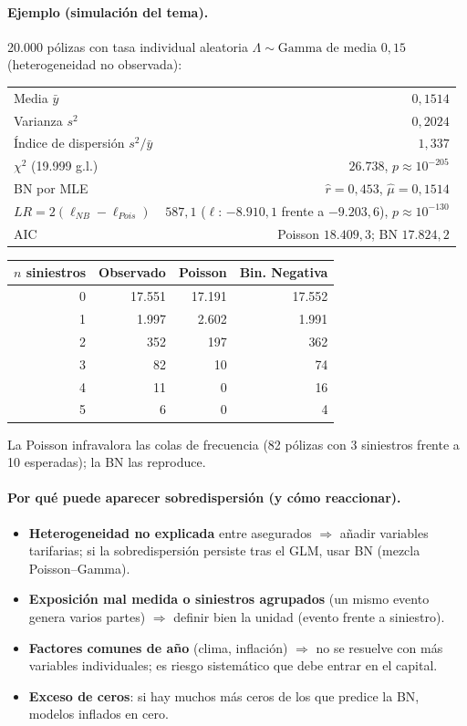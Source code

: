 \documentclass[a4paper,12pt]{article}
\begin{document}
\paragraph{Ejemplo (simulaci\'on del tema).} 20.000 p\'olizas con tasa individual aleatoria $\Lambda\sim\text{Gamma}$ de media $0{,}15$ (heterogeneidad no observada):
\begin{center}
\begin{tabular}{lr}
\toprule
Media $\bar y$ & $0{,}1514$\\
Varianza $s^2$ & $0{,}2024$\\
\'Indice de dispersi\'on $s^2/\bar y$ & $1{,}337$\\
$\chi^2$ (19.999 g.l.) & $26.738$, $p\approx10^{-205}$\\
BN por MLE & $\hat r=0{,}453$, $\hat\mu=0{,}1514$\\
$LR=2(\ell_{NB}-\ell_{Pois})$ & $587{,}1$ ($\ell$: $-8.910{,}1$ frente a $-9.203{,}6$), $p\approx10^{-130}$\\
AIC & Poisson $18.409{,}3$; BN $17.824{,}2$\\
\bottomrule
\end{tabular}
\end{center}
\begin{center}
\begin{tabular}{rrrr}
\toprule
$n$ siniestros & Observado & Poisson & Bin. Negativa\\
\midrule
0 & 17.551 & 17.191 & 17.552\\
1 & 1.997 & 2.602 & 1.991\\
2 & 352 & 197 & 362\\
3 & 82 & 10 & 74\\
4 & 11 & 0 & 16\\
5 & 6 & 0 & 4\\
\bottomrule
\end{tabular}
\end{center}
La Poisson infravalora las colas de frecuencia (82 p\'olizas con 3 siniestros frente a 10 esperadas); la BN las reproduce.

\paragraph{Por qu\'e puede aparecer sobredispersi\'on (y c\'omo reaccionar).}
\begin{itemize}[leftmargin=*,itemsep=1pt]
\item \textbf{Heterogeneidad no explicada} entre asegurados $\Rightarrow$ a\~nadir variables tarifarias; si la sobredispersi\'on persiste tras el GLM, usar BN (mezcla Poisson--Gamma).
\item \textbf{Exposici\'on mal medida o siniestros agrupados} (un mismo evento genera varios partes) $\Rightarrow$ definir bien la unidad (evento frente a siniestro).
\item \textbf{Factores comunes de a\~no} (clima, inflaci\'on) $\Rightarrow$ no se resuelve con m\'as variables individuales; es riesgo sistem\'atico que debe entrar en el capital.
\item \textbf{Exceso de ceros}: si hay muchos m\'as ceros de los que predice la BN, modelos inflados en cero.
\end{itemize}
\end{document}
